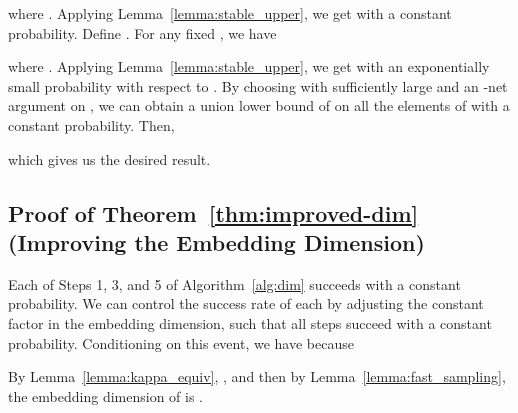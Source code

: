 \documentclass[11pt]{article}
\begin{document}
where .
Applying Lemma~\ref{lemma:stable_upper}, we get  with a constant probability.
Define .
For any fixed , we have

where .
Applying Lemma~\ref{lemma:stable_upper}, we get  with an exponentially small probability with respect to .
By choosing  with  sufficiently large and an
-net argument on , we can obtain a union lower bound of  on all the elements of  with a constant probability.
Then,

which gives us the desired result.


\subsection{Proof of Theorem~\ref{thm:improved-dim} (Improving the Embedding Dimension)}
\label{sxn:pf-imp-dim}

Each of Steps 1, 3, and 5 of Algorithm~\ref{alg:dim} succeeds with a constant
probability.
We can control the success rate of each by adjusting the constant factor in the
embedding dimension, such that all steps succeed with a constant probability.
Conditioning on this event, we have  because

By Lemma~\ref{lemma:kappa_equiv}, , and
then by Lemma~\ref{lemma:fast_sampling}, the embedding dimension of  is
.
\end{document}
